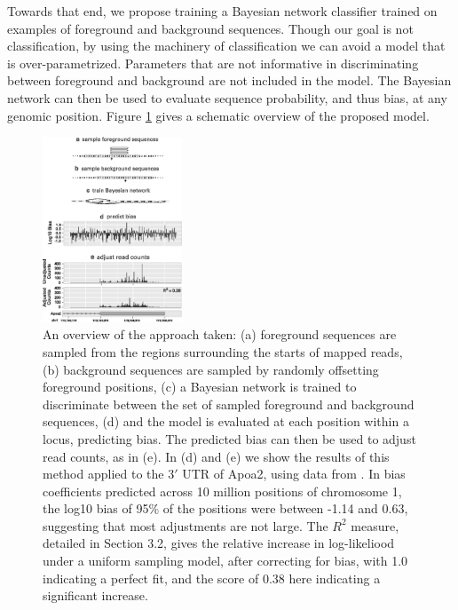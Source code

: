 \documentclass{bioinfo}
\begin{document}
Towards that end, we propose training a Bayesian network classifier trained on
examples of foreground and background sequences. Though our goal is not
classification, by using the machinery of classification we can avoid a model
that is over-parametrized. Parameters that are not informative in
discriminating between foreground and background are not included in the model.
The Bayesian network can then be used to evaluate sequence probability, and thus
bias, at any genomic position. Figure \ref{fig:overview} gives a schematic overview
of the proposed model.

\begin{figure}
\centerline{\includegraphics[width=0.37\textwidth]{overview.eps}}
\caption{An overview of the approach taken: (a) foreground sequences are sampled
from the regions surrounding the starts of mapped reads, (b) background
sequences are sampled by randomly offsetting foreground positions, (c) a
Bayesian network is trained to discriminate between the set of
sampled foreground and background sequences, (d) and the model is evaluated
at each position within a locus, predicting bias. The predicted bias can then be
used to adjust read counts, as in (e). In (d) and (e) we show the results of
this method applied to the $3'$ UTR of Apoa2, using data from
\citet{Mortazavi2008}. In bias coefficients predicted across 10 million positions
of chromosome 1, the log10 bias of 95\% of the positions were between -1.14 and
0.63, suggesting that most adjustments are not large. The $R^2$ measure,
detailed in Section 3.2, gives the relative increase in log-likeliood under a
uniform sampling model, after correcting for bias, with 1.0 indicating a perfect
fit, and the score of 0.38 here indicating a significant increase.
}
\label{fig:overview}
\end{figure}
\end{document}
